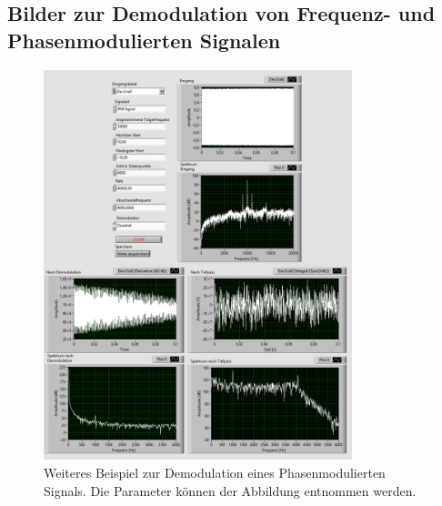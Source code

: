 \subsection{Bilder zur Demodulation von Frequenz- und Phasenmodulierten Signalen}

\begin{figure}[H]
	\centering
	\includegraphics[width=0.8\textwidth]{pic/PM10k1k001.png}
	\caption{Weiteres Beispiel zur Demodulation eines Phasenmodulierten Signals. Die Parameter können der Abbildung entnommen werden.}
	\label{fig:a13}	
\end{figure} 

